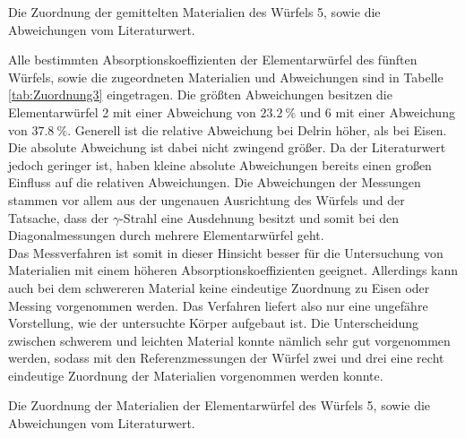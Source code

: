\begin{table}
	\centering
	\caption{Die Zuordnung der gemittelten Materialien des Würfels 5, sowie die Abweichungen vom Literaturwert.}
	
	\label{tab:Zuordnung2}
\end{table}

\noindent Alle bestimmten Absorptionskoeffizienten der Elementarwürfel des fünften Würfels, sowie die zugeordneten Materialien und Abweichungen sind in Tabelle \ref{tab:Zuordnung3} eingetragen. Die größten Abweichungen besitzen die Elementarwürfel 2 mit einer Abweichung von $\SI{23.2}{\%}$ und 6 mit einer Abweichung von $\SI{37.8}{\%}$. Generell ist die relative Abweichung bei Delrin höher, als bei Eisen. Die absolute Abweichung ist dabei nicht zwingend größer. Da der Literaturwert jedoch geringer ist, haben kleine absolute Abweichungen bereits einen großen Einfluss auf die relativen Abweichungen. Die Abweichungen der Messungen stammen vor allem aus der ungenauen Ausrichtung des Würfels und der Tatsache, dass der $\gamma$-Strahl eine Ausdehnung besitzt und somit bei den Diagonalmessungen durch mehrere Elementarwürfel geht.\\
Das Messverfahren ist somit in dieser Hinsicht besser für die Untersuchung von Materialien mit einem höheren Absorptionskoeffizienten geeignet. Allerdings kann auch bei dem schwereren Material keine eindeutige Zuordnung zu Eisen oder Messing vorgenommen werden. Das Verfahren liefert also nur eine ungefähre Vorstellung, wie der untersuchte Körper aufgebaut ist. Die Unterscheidung zwischen schwerem und leichten Material konnte nämlich sehr gut vorgenommen werden, sodass mit den Referenzmessungen der Würfel zwei und drei eine recht eindeutige Zuordnung der Materialien vorgenommen werden konnte.        

\begin{table}
	\centering
	\caption{Die Zuordnung der Materialien der Elementarwürfel des Würfels 5, sowie die Abweichungen vom Literaturwert.}
	
	\label{tab:Zuordnung3}
\end{table}
